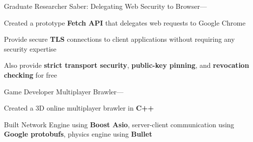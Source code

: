 


\begin{cventries}


\cventry
{Graduate Researcher} %
{Saber: Delegating Web Security to Browser---} %
{} %
{} %
{ %
\begin{cvitems}
\item{Created a prototype \textbf{Fetch API} that delegates web requests to Google Chrome}
\item{Provide secure \textbf{TLS} connections to client applications without requiring any security expertise}
\item{Also provide \textbf{strict transport security}, \textbf{public-key pinning}, and \textbf{revocation checking} for free}
\end{cvitems}
}


\cventry
{Game Developer} %
{Multiplayer Brawler---} %
{} %
{} %
{ %
\begin{cvitems}
\item{Created a 3D online multiplayer brawler in \textbf{C++}}
\item{Built Network Engine using \textbf{Boost Asio}, server-client communication using \textbf{Google protobufs}, physics engine using \textbf{Bullet}}
\end{cvitems}
}


\end{cventries}
